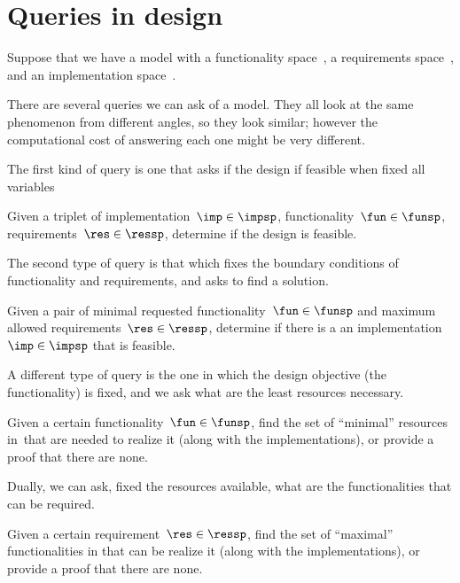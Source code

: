 \section{Queries in design}

Suppose that we have a model with a functionality space~\funsp, a requirements space~\ressp, and an implementation space~\impsp.

There are several queries we can ask of a model. They all look at the same phenomenon from different angles, so they look similar; however the computational cost of answering each one might be very different.

The first kind of query is one that asks if the design if feasible when fixed all variables

\begin{problem}
  Given a triplet of implementation~$\imp\in\impsp$, functionality~$\fun\in\funsp$, requirements~$\res\in\ressp$, determine if the design is feasible.
\end{problem}

The second type of query is that which fixes the boundary conditions of functionality and requirements, and asks to find a solution.

\begin{problem}
  Given a pair of minimal requested functionality~$\fun\in\funsp$ and maximum allowed requirements~$\res\in\ressp$, determine if there is a an implementation~$\imp\in\impsp$ that is feasible.
\end{problem}

A different type of query is the one in which the design objective (the functionality)
is fixed, and we ask what are the least resources necessary.


\begin{problem}[FixFunMinReq]
  Given a certain functionality~$\fun\in\funsp$, find the set of ``minimal'' resources in~\ressp that are needed to realize it (along with the implementations), or provide a proof that there are none.
\end{problem}


Dually, we can ask, fixed the resources available, what are the functionalities that can be required.

\begin{problem}[FixReqMinFun]
  Given a certain requirement~$\res\in\ressp$, find the set of ``maximal'' functionalities in that can be realize it (along with the implementations), or provide a proof that there are none.
\end{problem}

